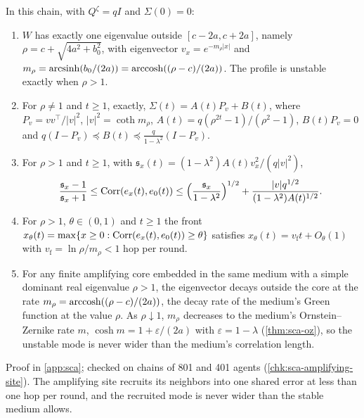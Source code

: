 \begin{proposition}\label{prop:sca-amplifying-site}
In this chain, with $Q^\zeta=qI$ and $\Sigma(0)=0$:
\begin{enumerate}
\item[(a)] $W$ has exactly one eigenvalue outside $[c-2a,c+2a]$, namely $\rho=c+\sqrt{4a^2+b_0^2}$, with eigenvector $v_x=e^{-m_\rho|x|}$ and $m_\rho=\operatorname{arcsinh}(b_0/(2a))=\operatorname{arccosh}((\rho-c)/(2a))$. The profile is unstable exactly when $\rho>1$.
\item[(b)] For $\rho\neq1$ and $t\ge1$, exactly, $\Sigma(t)=A(t)P_v+B(t)$, where $P_v=vv^\top/|v|^2$, $|v|^2=\coth m_\rho$, $A(t)=q(\rho^{2t}-1)/(\rho^2-1)$, $B(t)P_v=0$ and $q(I-P_v)\preceq B(t)\preceq\frac{q}{1-\lambda^2}(I-P_v)$.
\item[(c)] For $\rho>1$ and $t\ge1$, with $\mathfrak s_x(t)=(1-\lambda^2)A(t)v_x^2/(q|v|^2)$,
\begin{equation}\label{eq:sca-front-bounds}
\frac{\mathfrak s_x-1}{\mathfrak s_x+1}\le\operatorname{Corr}(e_x(t),e_0(t))\le\Bigl(\frac{\mathfrak s_x}{1-\lambda^2}\Bigr)^{1/2}+\frac{|v|q^{1/2}}{(1-\lambda^2)A(t)^{1/2}}.
\end{equation}
\item[(d)] For $\rho>1$, $\theta\in(0,1)$ and $t\ge1$ the front $x_\theta(t)=\max\{x\ge0:\operatorname{Corr}(e_x(t),e_0(t))\ge\theta\}$ satisfies $x_\theta(t)=v_{\mathrm f}t+O_\theta(1)$ with $v_{\mathrm f}=\ln\rho/m_\rho<1$ hop per round.
\item[(e)] For any finite amplifying core embedded in the same medium with a simple dominant real eigenvalue $\rho>1$, the eigenvector decays outside the core at the rate $m_\rho=\operatorname{arccosh}((\rho-c)/(2a))$, the decay rate of the medium's Green function at the value $\rho$. As $\rho\downarrow1$, $m_\rho$ decreases to the medium's Ornstein--Zernike rate $m$, $\cosh m=1+\varepsilon/(2a)$ with $\varepsilon=1-\lambda$ (\cref{thm:sca-oz}), so the unstable mode is never wider than the medium's correlation length.
\end{enumerate}
\end{proposition}
Proof in \cref{app:sca}; checked on chains of 801 and 401 agents (\cref{chk:sca-amplifying-site}). The amplifying site recruits its neighbors into one shared error at less than one hop per round, and the recruited mode is never wider than the stable medium allows.

